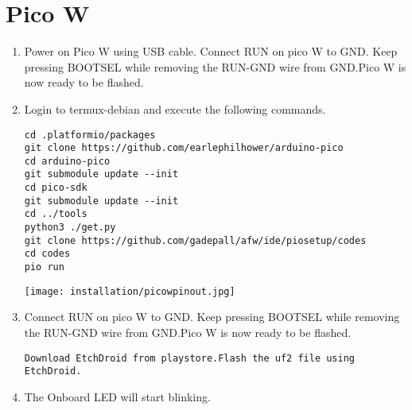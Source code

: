\documentclass[journal]{IEEEtran}
\begin{document}

\onecolumn

\newpage
\onecolumn


\iffalse
\renewcommand{\thefigure}{\theenumi}
\renewcommand{\thetable}{\theenumi}
\renewcommand{\theequation}{\theenumi}
\fi
\section{Pico W}
\begin{enumerate}[label=\arabic*.,ref=\theenumi]

\item Power on Pico W using USB cable. Connect RUN on pico W to GND. Keep pressing BOOTSEL while removing the RUN-GND wire from GND.Pico W is now ready to be flashed.
\item Login to termux-debian and execute the following commands.
\begin{lstlisting}
cd .platformio/packages
git clone https://github.com/earlephilhower/arduino-pico
cd arduino-pico
git submodule update --init
cd pico-sdk
git submodule update --init
cd ../tools
python3 ./get.py
git clone https://github.com/gadepall/afw/ide/piosetup/codes
cd codes
pio run
\end{lstlisting}
\begin{center}
    \texttt{[image: installation/picowpinout.jpg]}
    \vspace{0.5em} %
\end{center}
\vspace{0.5em} %
\item Connect RUN on pico W to GND. Keep pressing BOOTSEL while removing the RUN-GND wire from GND.Pico W is now ready to be flashed.
\begin{lstlisting}
Download EtchDroid from playstore.Flash the uf2 file using EtchDroid.
\end{lstlisting}
\vspace{0.5em} %
\item The Onboard LED will start blinking.
\end{enumerate}
\end{document}
